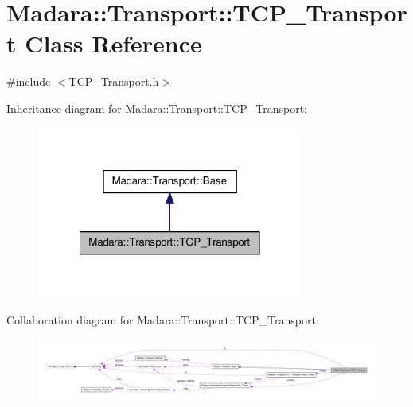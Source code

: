 \hypertarget{classMadara_1_1Transport_1_1TCP__Transport}{
\section{Madara::Transport::TCP\_\-Transport Class Reference}
\label{d6/df1/classMadara_1_1Transport_1_1TCP__Transport}
}


{\ttfamily \#include $<$TCP\_\-Transport.h$>$}



Inheritance diagram for Madara::Transport::TCP\_\-Transport:
\nopagebreak
\begin{figure}[H]
\begin{center}
\leavevmode
\includegraphics[width=248pt]{de/d9c/classMadara_1_1Transport_1_1TCP__Transport__inherit__graph}
\end{center}
\end{figure}


Collaboration diagram for Madara::Transport::TCP\_\-Transport:
\nopagebreak
\begin{figure}[H]
\begin{center}
\leavevmode
\includegraphics[width=400pt]{d4/d8f/classMadara_1_1Transport_1_1TCP__Transport__coll__graph}
\end{center}
\end{figure}
